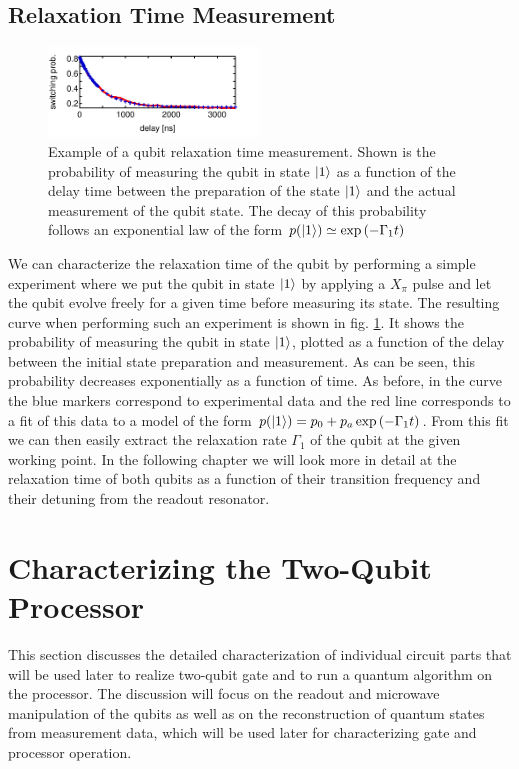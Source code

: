 \section{Relaxation Time Measurement}

\begin{figure}[ht!]
\centering
\includegraphics[width=0.5\textwidth]{"./data/ct5/2011_04_21 - grover and tomo/example - qubit 2 t1"}
\caption[]{Example of a qubit relaxation time measurement. Shown is the probability of measuring the qubit in state $\left| 1 \right>$ as a function of the delay time between the preparation of the state $\left| 1 \right>$ and the actual measurement of the qubit state. The decay of this probability follows an exponential law of the form $p(\left| 1 \right>)\simeq\exp{(-\Gamma_1 t)}$}
\label{fig:qubit_t1_example}
\end{figure}

We can characterize the relaxation time of the qubit by performing a simple experiment where we put the qubit in state $\left| 1 \right>$ by applying a $X_{\pi}$ pulse and let the qubit evolve freely for a given time before measuring its state. The resulting curve when performing such an experiment is shown in fig. \ref{fig:qubit_t1_example}. It shows the probability of measuring the qubit in state $\left| 1 \right>$, plotted as a function of the delay between the initial state preparation and measurement. As can be seen, this probability decreases exponentially as a function of time. As before, in the curve the blue markers correspond to experimental data and the red line corresponds to a fit of this data to a model of the form $p(\left| 1 \right>) = p_0+p_a\exp{(-\Gamma_1 t)}$. From this fit we can then easily extract the relaxation rate $\Gamma_1$ of the qubit at the given working point. In the following chapter we will look more in detail at the relaxation time of both qubits as a function of their transition frequency and their detuning from the readout resonator.

\chapter{Characterizing the Two-Qubit Processor}

This section discusses the detailed characterization of individual circuit parts that will be used later to realize two-qubit gate and to run a quantum algorithm on the processor. The discussion will focus on the readout and microwave manipulation of the qubits as well as  on the reconstruction of quantum states from measurement data, which will be used later for characterizing gate and processor operation.

